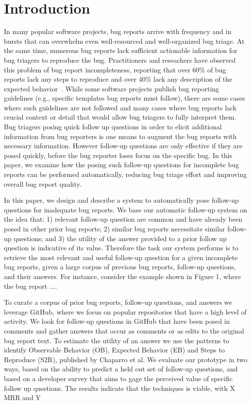 \section{Introduction}

In many popular software projects, bug reports arrive with frequency and in bursts that can overwhelm even well-resourced and well-organized bug triage.
%
At the same time, numerous bug reports lack sufficient actionable information for bug triagers to reproduce the bug.
%
Practitioners and reseachers have observed this problem of bug report incompleteness, reporting that over 60\% of bug reports lack any steps to reproduce and over 40\% lack any description of the expected behavior~\cite{chaparro17detecting}.
%
While some software projects publish bug reporting guidelines (e.g., specific templates bug reports must follow), there are some cases where such guidelines are not followed and many cases where bug reports lack crucial context or detail that would allow bug triagers to fully interpret them.
%
Bug triagers posing quick follow up questions in order to elicit additional information from bug reporters is one means to augment the bug reports with necessary information.
%
However follow-up questions are only effective if they are posed quickly, before the bug reporter loses focus on the specific bug.
%
In this paper, we examine how the posing such follow-up questions for incomplete bug reports can be performed automatically, reducing bug triage effort and improving overall bug report quality.

In this paper, we design and describe a system to automatically pose follow-up questions for inadequate bug reports.
%
We base our automatic follow-up system on the idea that: 1) relevant follow-up question are common and have already been posed in other prior bug reports; 2) similar bug reports necessitate similar follow-up questions; and 3) the utility of the answer provided to a prior follow up question is indicative of its value.
%
Therefore the task our system performs is to retrieve the most relevant and useful follow-up question for a given incomplete bug reports, given a large corpus of previous bug reports, follow-up questions, and their answers.
%
For instance, consider the example shown in Figure 1, where the bug report ....

To curate a corpus of prior bug reports, follow-up questions, and answers we leverage GitHub, where we focus on popular repositories that have a high level of activity. We look for follow-up questions in GitHub that have been posed in comments and gather answers that occur as comments or as edits to the original bug report text. To estimate the utility of an answer we use the patterns to identify Observable Behavior (OB), Expected Behavior (EB) and Steps to Reproduce (S2R), published by Chaparro et al. We evaluate our prototype in two ways, based on the ability to predict a held out set of follow-up questions, and based on a developer survey that aims to gage the perceived value of specific follow up questions. The results indicate that the techniques is viable, with X MRR and Y%

